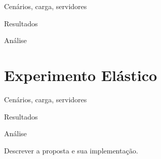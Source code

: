 Cenários, carga, servidores

Resultados

Análise

\section{Experimento Elástico}\label{sec:experimento:replicas_leitoras}

Cenários, carga, servidores

Resultados

Análise


Descrever a proposta e sua implementação.

